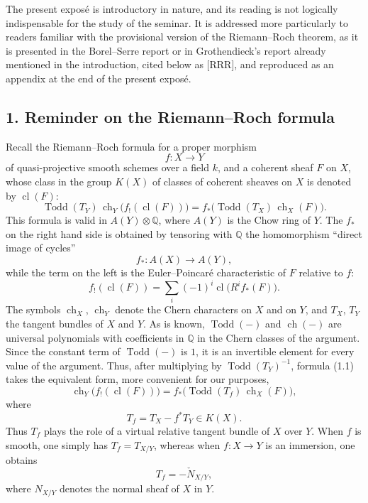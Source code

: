 \documentclass[11pt]{article}
\newcommand{\ch}{\operatorname{ch}}
\newcommand{\Todd}{\operatorname{Todd}}
\newcommand{\cl}{\operatorname{cl}}
\begin{document}
The present exposé is introductory in nature, and its reading is not logically indispensable for the study of the seminar. It is addressed more particularly to readers familiar with the provisional version of the Riemann--Roch theorem, as it is presented in the Borel--Serre report or in Grothendieck's report already mentioned in the introduction, cited below as [RRR], and reproduced as an appendix at the end of the present exposé.

\subsection*{1. Reminder on the Riemann--Roch formula}
Recall the Riemann--Roch formula for a proper morphism
\[
f:X\longrightarrow Y
\]
of quasi-projective smooth schemes over a field $k$, and a coherent sheaf $F$ on $X$, whose class in the group $K(X)$ of classes of coherent sheaves on $X$ is denoted by $\cl(F)$:
\begin{equation}\tag{1.1}
\Todd(T_Y)\,\ch_Y\bigl(f_!(\cl(F))\bigr)=f_*\bigl(\Todd(T_X)\,\ch_X(F)\bigr).
\end{equation}
This formula is valid in $A(Y)\otimes\mathbb Q$, where $A(Y)$ is the Chow ring of $Y$. The $f_*$ on the right hand side is obtained by tensoring with $\mathbb Q$ the homomorphism ``direct image of cycles''
\[
f_*:A(X)\longrightarrow A(Y),
\]
while the term on the left is the Euler--Poincaré characteristic of $F$ relative to $f$:
\[
f_!(\cl(F))=\sum_i(-1)^i\cl\bigl(R^if_*(F)\bigr).
\]
The symbols $\ch_X$, $\ch_Y$ denote the Chern characters on $X$ and on $Y$, and $T_X$, $T_Y$ the tangent bundles of $X$ and $Y$. As is known, $\Todd(-)$ and $\ch(-)$ are universal polynomials with coefficients in $\mathbb Q$ in the Chern classes of the argument. Since the constant term of $\Todd(-)$ is $1$, it is an invertible element for every value of the argument. Thus, after multiplying by $\Todd(T_Y)^{-1}$, formula (1.1) takes the equivalent form, more convenient for our purposes,
\begin{equation}\tag{1.2}
\ch_Y\bigl(f_!(\cl(F))\bigr)=f_*\bigl(\Todd(T_f)\,\ch_X(F)\bigr),
\end{equation}
where
\begin{equation}\tag{1.3}
T_f=T_X-f^*T_Y\in K(X).
\end{equation}
Thus $T_f$ plays the role of a virtual relative tangent bundle of $X$ over $Y$. When $f$ is smooth, one simply has $T_f=T_{X/Y}$, whereas when $f:X\to Y$ is an immersion, one obtains
\[
T_f=-\check N_{X/Y},
\]
where $N_{X/Y}$ denotes the normal sheaf of $X$ in $Y$.
\end{document}
